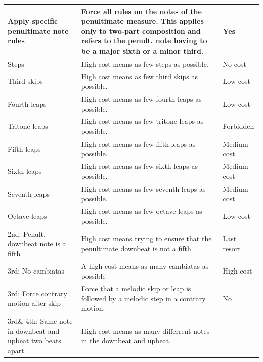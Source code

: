 \begin{table}[h!]
\begin{adjustbox}{center}
\begin{tabular}{|m{}|m{}|m{}<{\centering}|}
        \cellcolor[HTML]{C8D6FF}Apply specific penultimate note rules &
          Force all rules on the notes of the penultimate measure. This applies only to two-part composition and  refers to the penult. note having to be a major sixth or a minor third. &
          Yes \\ \hline
        \hline
        \cellcolor[HTML]{BCE08D}Steps &
          High cost means as few steps as possible. &
          No cost \\ \hline
        \cellcolor[HTML]{BCE08D}Third skips &
          High cost means as few third skips as possible. &
          Low cost \\ \hline
        \cellcolor[HTML]{BCE08D}Fourth leaps &
          High cost means as few fourth leaps as possible. &
          Low cost \\ \hline
        \cellcolor[HTML]{BCE08D}Tritone leaps&
          High cost means as few tritone leaps as possible. &
          Forbidden \\ \hline
        \cellcolor[HTML]{BCE08D}Fifth leaps&
          High cost means as few fifth leaps as possible. &
          Medium cost \\ \hline
        \cellcolor[HTML]{BCE08D}Sixth leaps&
          High cost means as few sixth leaps as possible. &
          Medium cost \\ \hline
        \cellcolor[HTML]{BCE08D}Seventh leaps&
          High cost means as few seventh leaps as possible. &
          Medium cost \\ \hline
        \cellcolor[HTML]{BCE08D}Octave leaps&
          High cost means as few octave leaps as possible. &
          Low cost \\ \hline
        \hline      
        \cellcolor[HTML]{FFCE93}2nd: Penult. downbeat note is a fifth &
          High cost means trying to ensure that the penultimate downbeat is not a fifth.&
          Last resort \\ \hline
        \cellcolor[HTML]{FFCE93}3rd: No cambiatas &
          A high cost means as many cambiatas as possible &
          High cost \\ \hline
        \cellcolor[HTML]{FFCE93}3rd: Force contrary motion after skip &
          Force that a melodic skip or leap is followed by a melodic step in a contrary motion. &
          No \\ \hline
        \cellcolor[HTML]{FFCE93}3rd\& 4th: Same note in downbeat and upbeat two beats apart &
          High cost means as many differrent notes in the downbeat and upbeat.&

\end{tabular}
\end{adjustbox}
\end{table}
